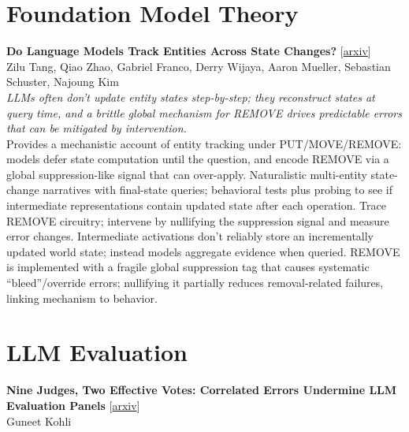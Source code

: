 \documentclass[12pt,letterpaper]{article}
\begin{document}
\medskip


\section*{Foundation Model Theory}

{\small\textbf{Do Language Models Track Entities Across State Changes?}} {\scriptsize[\href{https://arxiv.org/abs/2605.30233}{arxiv}]}\\
{\scriptsize Zilu Tang, Qiao Zhao, Gabriel Franco, Derry Wijaya, Aaron Mueller, Sebastian Schuster, Najoung Kim}\\

{\small\textit{LLMs often don't update entity states step-by-step; they reconstruct states at query time, and a brittle global mechanism for REMOVE drives predictable errors that can be mitigated by intervention.}}\\[1pt]
{\footnotesize Provides a mechanistic account of entity tracking under PUT/MOVE/REMOVE: models defer state computation until the question, and encode REMOVE via a global suppression-like signal that can over-apply. Naturalistic multi-entity state-change narratives with final-state queries; behavioral tests plus probing to see if intermediate representations contain updated state after each operation. Trace REMOVE circuitry; intervene by nullifying the suppression signal and measure error changes. Intermediate activations don't reliably store an incrementally updated world state; instead models aggregate evidence when queried. REMOVE is implemented with a fragile global suppression tag that causes systematic ``bleed''/override errors; nullifying it partially reduces removal-related failures, linking mechanism to behavior.}

\medskip


\section*{LLM Evaluation}

{\small\textbf{Nine Judges, Two Effective Votes: Correlated Errors Undermine LLM Evaluation Panels}} {\scriptsize[\href{https://arxiv.org/abs/2605.29800}{arxiv}]}\\
{\scriptsize Guneet Kohli}\\
\end{document}
